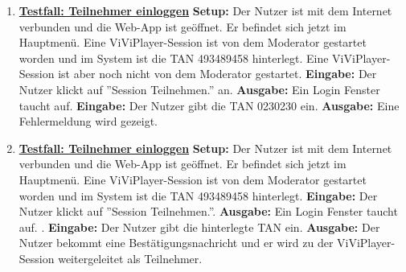 \begin{enumerate}
	
	\item \underline{\textbf{Testfall: Teilnehmer einloggen}} \linebreak
	\textbf{Setup:} Der Nutzer ist mit dem Internet verbunden und die Web-App ist geöffnet. Er befindet sich jetzt im Hauptmenü. Eine ViViPlayer-Session ist von dem Moderator gestartet worden und im System ist die TAN 493489458 hinterlegt.
	Eine ViViPlayer-Session ist aber noch nicht von dem Moderator gestartet. \linebreak
	\textbf{Eingabe:} Der Nutzer klickt auf ''Session Teilnehmen.'' an. \linebreak
	\textbf{Ausgabe:} Ein Login Fenster taucht auf.\linebreak
	\textbf{Eingabe:} Der Nutzer gibt die TAN 0230230 ein. \linebreak
	\textbf{Ausgabe:} Eine Fehlermeldung wird gezeigt.
	
	\item \underline{\textbf{Testfall: Teilnehmer einloggen}} \linebreak
	\textbf{Setup:} Der Nutzer ist mit dem Internet verbunden und die Web-App ist geöffnet. Er befindet sich jetzt im Hauptmenü. Eine ViViPlayer-Session ist von dem Moderator gestartet worden und im System ist die TAN 493489458 hinterlegt. \linebreak
	\textbf{Eingabe:} Der Nutzer klickt auf ''Session Teilnehmen.''. \linebreak
	\textbf{Ausgabe:} Ein Login Fenster taucht auf. .\linebreak
	\textbf{Eingabe:} Der Nutzer gibt die hinterlegte TAN ein. \linebreak
	\textbf{Ausgabe:} Der Nutzer bekommt eine Bestätigungsnachricht und er wird zu der ViViPlayer-Session weitergeleitet als Teilnehmer.
	

\end{enumerate}
